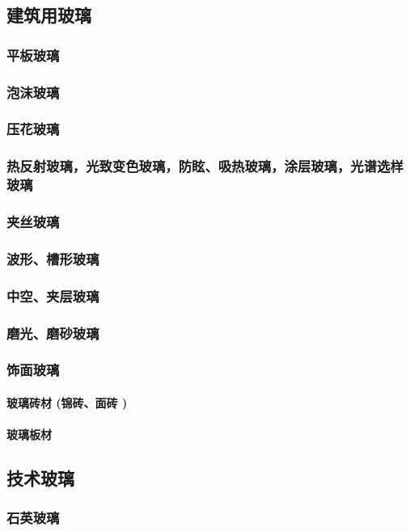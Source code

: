 \documentclass[UTF8]{../../ApplicationUniverse}
\begin{document}
    \subsection{建筑用玻璃}
        \subsubsection{平板玻璃}
        \subsubsection{泡沫玻璃}
        \subsubsection{压花玻璃}
        \subsubsection{热反射玻璃，光致变色玻璃，防眩、吸热玻璃，涂层玻璃，光谱选样玻璃}
        \subsubsection{夹丝玻璃}
        \subsubsection{波形、槽形玻璃}
        \subsubsection{中空、夹层玻璃}
        \subsubsection{磨光、磨砂玻璃}
        \subsubsection{饰面玻璃}
            \paragraph{玻璃砖材 (锦砖、面砖 )}
            \paragraph{玻璃板材}
    \subsection{技术玻璃}
        \subsubsection{石英玻璃}
\end{document}
